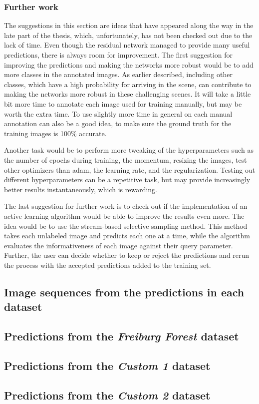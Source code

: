 \documentclass[USenglish]{ifimaster}  %
\begin{document}
\subsection{Further work}
The suggestions in this section are ideas that have appeared along the way in the late part of the thesis, which, unfortunately, has not been checked out due to the lack of time. Even though the residual network managed to provide many useful predictions, there is always room for improvement. The first suggestion for improving the predictions and making the networks more robust would be to add more classes in the annotated images. As earlier described, including other classes, which have a high probability for arriving in the scene, can contribute to making the networks more robust in these challenging scenes. It will take a little bit more time to annotate each image used for training manually, but may be worth the extra time. To use slightly more time in general on each manual annotation can also be a good idea, to make sure the ground truth for the training images is 100\% accurate.

Another task would be to perform more tweaking of the hyperparameters such as the number of epochs during training, the momentum, resizing the images, test other optimizers than adam, the learning rate, and the regularization. Testing out different hyperparameters can be a repetitive task, but may provide increasingly better results instantaneously, which is rewarding.   

The last suggestion for further work is to check out if the implementation of an active learning algorithm would be able to improve the results even more. The idea would be to use the stream-based selective sampling method. This method takes each unlabeled image and predicts each one at a time, while the algorithm evaluates the informativeness of each image against their query parameter. Further, the user can decide whether to keep or reject the predictions and rerun the process with the accepted predictions added to the training set.

\begin{appendices}
\chapter{Image sequences from the predictions in each dataset}\label{appendix}
\section{Predictions from the \textit{Freiburg Forest} dataset}\label{appendix_freiburg}
\section{Predictions from the \textit{Custom 1} dataset}\label{appendix_1}
\section{Predictions from the \textit{Custom 2} dataset}\label{appendix_2}
\end{appendices}

\backmatter{}
\printbibliography
\end{document}
